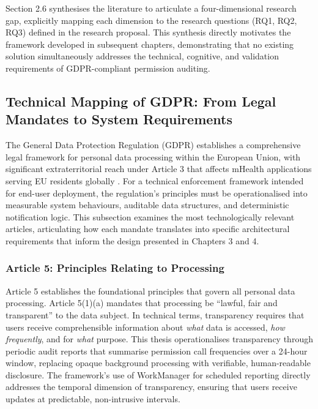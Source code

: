 Section 2.6 synthesises the literature to articulate a four-dimensional research gap, explicitly mapping each dimension to the research questions (RQ1, RQ2, RQ3) defined in the research proposal. This synthesis directly motivates the framework developed in subsequent chapters, demonstrating that no existing solution simultaneously addresses the technical, cognitive, and validation requirements of GDPR-compliant permission auditing.

\subsection{Technical Mapping of GDPR: From Legal Mandates to System Requirements}
The General Data Protection Regulation (GDPR) \cite{1} establishes a comprehensive legal framework for personal data processing within the European Union, with significant extraterritorial reach under Article 3 that affects mHealth applications serving EU residents globally \cite{19}. For a technical enforcement framework intended for end-user deployment, the regulation's principles must be operationalised into measurable system behaviours, auditable data structures, and deterministic notification logic. This subsection examines the most technologically relevant articles, articulating how each mandate translates into specific architectural requirements that inform the design presented in Chapters 3 and 4.

\subsubsection{Article 5: Principles Relating to Processing}
Article 5 establishes the foundational principles that govern all personal data processing. Article 5(1)(a) mandates that processing be ``lawful, fair and transparent'' to the data subject. In technical terms, transparency requires that users receive comprehensible information about \emph{what} data is accessed, \emph{how frequently}, and for \emph{what} purpose. This thesis operationalises transparency through periodic audit reports that summarise permission call frequencies over a 24-hour window, replacing opaque background processing with verifiable, human-readable disclosure. The framework's use of WorkManager for scheduled reporting directly addresses the temporal dimension of transparency, ensuring that users receive updates at predictable, non-intrusive intervals.

